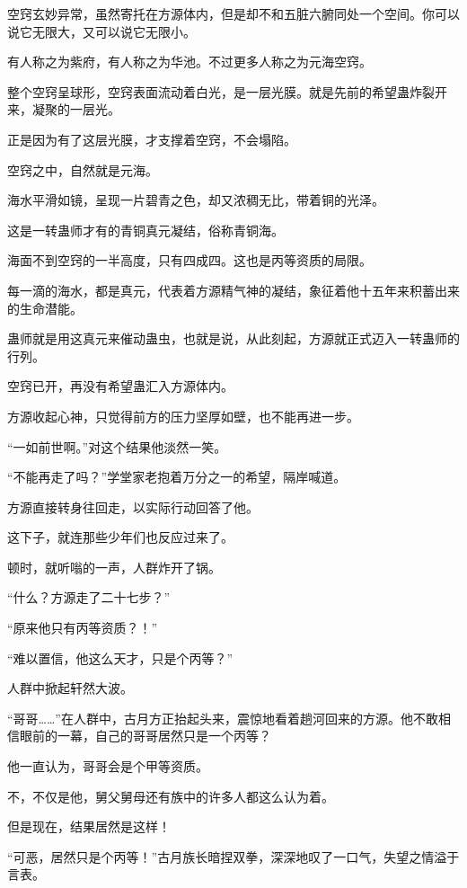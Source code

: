 
\begin{this_body}

空窍玄妙异常，虽然寄托在方源体内，但是却不和五脏六腑同处一个空间。你可以说它无限大，又可以说它无限小。

有人称之为紫府，有人称之为华池。不过更多人称之为元海空窍。

整个空窍呈球形，空窍表面流动着白光，是一层光膜。就是先前的希望蛊炸裂开来，凝聚的一层光。

正是因为有了这层光膜，才支撑着空窍，不会塌陷。

空窍之中，自然就是元海。

海水平滑如镜，呈现一片碧青之色，却又浓稠无比，带着铜的光泽。

这是一转蛊师才有的青铜真元凝结，俗称青铜海。

海面不到空窍的一半高度，只有四成四。这也是丙等资质的局限。

每一滴的海水，都是真元，代表着方源精气神的凝结，象征着他十五年来积蓄出来的生命潜能。

蛊师就是用这真元来催动蛊虫，也就是说，从此刻起，方源就正式迈入一转蛊师的行列。

空窍已开，再没有希望蛊汇入方源体内。

方源收起心神，只觉得前方的压力坚厚如壁，也不能再进一步。

“一如前世啊。”对这个结果他淡然一笑。

“不能再走了吗？”学堂家老抱着万分之一的希望，隔岸喊道。

方源直接转身往回走，以实际行动回答了他。

这下子，就连那些少年们也反应过来了。

顿时，就听嗡的一声，人群炸开了锅。

“什么？方源走了二十七步？”

“原来他只有丙等资质？！”

“难以置信，他这么天才，只是个丙等？”

人群中掀起轩然大波。

“哥哥……”在人群中，古月方正抬起头来，震惊地看着趟河回来的方源。他不敢相信眼前的一幕，自己的哥哥居然只是一个丙等？

他一直认为，哥哥会是个甲等资质。

不，不仅是他，舅父舅母还有族中的许多人都这么认为着。

但是现在，结果居然是这样！

“可恶，居然只是个丙等！”古月族长暗捏双拳，深深地叹了一口气，失望之情溢于言表。


\end{this_body}
